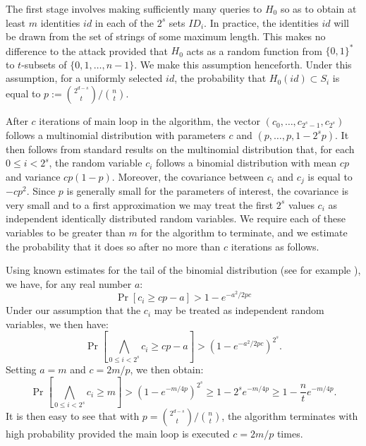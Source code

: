 \documentclass{llncs}
\begin{document}
The first stage involves making sufficiently many queries to $H_0$ so as to
obtain at least $m$ identities $id$ in each of the $2^s$ sets $ID_i$. In
practice, the identities $id$ will be drawn from the set of strings of some
maximum length. This makes no difference to the attack provided that $H_0$ acts
as a random function from $\{0,1\}^*$ to $t$-subsets of $\{0,1,\ldots,n-1\}$.
We make this assumption henceforth. Under this assumption, for a uniformly
selected $id$, the probability that $H_0(id) \subset S_i$ is equal to
$p:={2^{d-s} \choose t} /{n \choose t}$.

After $c$ iterations of main loop in the algorithm, the vector
$(c_0,\ldots,c_{2^s-1},c_{2^s})$ follows a multinomial distribution with
parameters $c$ and $(p,\ldots,p,1-2^sp)$. It then follows from standard results
on the multinomial distribution that, for each $0 \le i <2^s$, the random
variable $c_i$ follows a binomial distribution with mean $cp$ and variance
$cp(1-p)$. Moreover, the covariance between $c_i$ and $c_j$ is equal to
$-cp^2$. Since $p$ is generally small for the parameters of interest, the
covariance is very small and to a first approximation we may treat the first
$2^s$ values $c_i$ as independent identically distributed random variables. We
require each of these variables to be greater than $m$ for the algorithm to
terminate, and we estimate the probability that it does so after no more than
$c$ iterations as follows.

Using known estimates for the tail of the binomial distribution (see for
example \cite[Theorem A.13]{AS}), we have, for any real number $a$:
\[
\Pr[c_i \ge cp-a] > 1 - e^{-a^2/2pc}
\]
Under our assumption that the $c_i$ may be treated as independent random
variables, we then have:
\[
\Pr[\bigwedge_{0 \le i < 2^s}c_i \ge cp-a] > (1 - e^{-a^2/2pc})^{2^s}.
\]
Setting $a=m$ and $c=2m/p$, we then obtain:
\[
\Pr[\bigwedge_{0 \le i < 2^s}c_i \ge m] > (1 - e^{-m/4p})^{2^s} \ge
1-2^se^{-m/4p}\ge
1-\frac{n}{t}e^{-m/4p}.
\]
It is then easy to see that with $p = {2^{d-s} \choose t} /{n \choose t}$, the
algorithm terminates with high probability provided the main loop is executed
$c=2m/p$ times.
\end{document}
